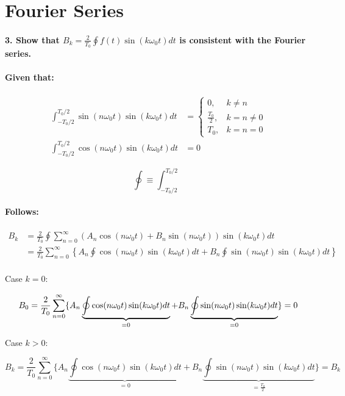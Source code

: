 \section*{Fourier Series}
\paragraph{3. Show that $B_k = \frac{2}{T_0} \oint f(t) \sin(k \omega_0 t) dt$ is consistent with the Fourier series.}
\paragraph{Given that:}

\begin{align}
	\int_{-T_0/2}^{T_0/2} \sin(n \omega_0 t) \sin(k \omega_0 t) dt &=
	\begin{cases}
		0,& k \neq n\\
		\frac{T_0}{2},& k = n \neq 0\\
		T_0,& k = n = 0
	\end{cases}
	\\
	\int_{-T_0/2}^{T_0/2} \cos(n \omega_0 t) \sin(k \omega_0 t) dt &= 0 
\end{align}

\begin{equation}
	\oint \equiv \int_{-T_0/2}^{T_0/2}
\end{equation}

\paragraph{Follows:}

\begin{align*}
	B_k &= \frac{2}{T_0} \oint \sum_{n=0}^\infty \left(A_n \cos(n \omega_0 t) + B_n \sin(n \omega_0 t) \right) \sin(k \omega_0 t) dt \\
	&= \frac{2}{T_0} \sum_{n=0}^\infty \left\{A_n \oint \cos(n \omega_0 t) \sin(k \omega_0 t) dt + B_n \oint \sin(n \omega_0 t) \sin(k \omega_0 t) dt \right\} \\
\end{align*}

Case $k = 0$:

\[
	B_0 = \frac{2}{T_0} \sum_{n=0}^\infty \{A_n \underbrace{\oint \cos(n \omega_0 t) \sin(k \omega_0 t) dt}_{=0} + B_n \underbrace{\oint \sin(n \omega_0 t) \sin(k \omega_0 t) dt}_{=0} \} = 0\\
\]

Case $k > 0$:

\[
	B_k = \frac{2}{T_0} \sum_{n=0}^\infty \{A_n \underbrace{\oint \cos(n \omega_0 t) \sin(k \omega_0 t) dt}_{=0} + B_n \underbrace{\oint \sin(n \omega_0 t) \sin(k \omega_0 t) dt}_{=\frac{T_0}{2}} \} = B_k
\]

